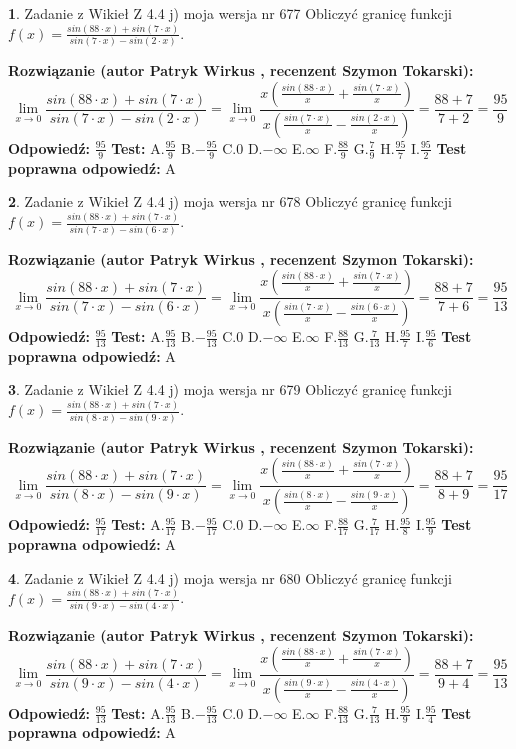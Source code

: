 \documentclass[12pt, a4paper]{article}
\theoremstyle{definition} %
\newtheorem{zad}{}
\newcommand{\zadStart}[1]{\begin{zad}#1\newline}
\newcommand{\zadStop}{\end{zad}}
\newcommand{\rozwStart}[2]{\noindent \textbf{Rozwiązanie (autor #1 , recenzent #2): }\newline}
\newcommand{\rozwStop}{\newline}
\newcommand{\odpStart}{\noindent \textbf{Odpowiedź:}\newline}
\newcommand{\odpStop}{\newline}
\newcommand{\testStart}{\noindent \textbf{Test:}\newline}
\newcommand{\testStop}{\newline}
\newcommand{\kluczStart}{\noindent \textbf{Test poprawna odpowiedź:}\newline}
\newcommand{\kluczStop}{\newline}
\begin{document}
\zadStart{Zadanie z Wikieł Z 4.4 j) moja wersja nr 677}
Obliczyć granicę funkcji $f(x)=\frac{sin(88\cdot x) +sin(7\cdot x)}{sin(7\cdot x) -sin(2\cdot x)}$.
\zadStop
\rozwStart{Patryk Wirkus}{Szymon Tokarski}
$$\lim\limits_{x\to 0}\frac{sin(88\cdot x) +sin(7\cdot x)}{sin(7\cdot x) -sin(2\cdot x)}=\lim\limits_{x\to 0}\frac{x(\frac{sin(88\cdot x)}{x}+\frac{sin(7\cdot x)}{x})}{x(\frac{sin(7\cdot x)}{x}-\frac{sin(2\cdot x)}{x})}=\frac{88+7}{7+2} = \frac{95}{9}$$
\rozwStop
\odpStart
$\frac{95}{9}$
\odpStop
\testStart
A.$\frac{95}{9}$
B.$-\frac{95}{9}$
C.$0$
D.$-\infty$
E.$\infty$
F.$\frac{88}{9}$
G.$\frac{7}{9}$
H.$\frac{95}{7}$
I.$\frac{95}{2}$
\testStop
\kluczStart
A
\kluczStop



\zadStart{Zadanie z Wikieł Z 4.4 j) moja wersja nr 678}
Obliczyć granicę funkcji $f(x)=\frac{sin(88\cdot x) +sin(7\cdot x)}{sin(7\cdot x) -sin(6\cdot x)}$.
\zadStop
\rozwStart{Patryk Wirkus}{Szymon Tokarski}
$$\lim\limits_{x\to 0}\frac{sin(88\cdot x) +sin(7\cdot x)}{sin(7\cdot x) -sin(6\cdot x)}=\lim\limits_{x\to 0}\frac{x(\frac{sin(88\cdot x)}{x}+\frac{sin(7\cdot x)}{x})}{x(\frac{sin(7\cdot x)}{x}-\frac{sin(6\cdot x)}{x})}=\frac{88+7}{7+6} = \frac{95}{13}$$
\rozwStop
\odpStart
$\frac{95}{13}$
\odpStop
\testStart
A.$\frac{95}{13}$
B.$-\frac{95}{13}$
C.$0$
D.$-\infty$
E.$\infty$
F.$\frac{88}{13}$
G.$\frac{7}{13}$
H.$\frac{95}{7}$
I.$\frac{95}{6}$
\testStop
\kluczStart
A
\kluczStop



\zadStart{Zadanie z Wikieł Z 4.4 j) moja wersja nr 679}
Obliczyć granicę funkcji $f(x)=\frac{sin(88\cdot x) +sin(7\cdot x)}{sin(8\cdot x) -sin(9\cdot x)}$.
\zadStop
\rozwStart{Patryk Wirkus}{Szymon Tokarski}
$$\lim\limits_{x\to 0}\frac{sin(88\cdot x) +sin(7\cdot x)}{sin(8\cdot x) -sin(9\cdot x)}=\lim\limits_{x\to 0}\frac{x(\frac{sin(88\cdot x)}{x}+\frac{sin(7\cdot x)}{x})}{x(\frac{sin(8\cdot x)}{x}-\frac{sin(9\cdot x)}{x})}=\frac{88+7}{8+9} = \frac{95}{17}$$
\rozwStop
\odpStart
$\frac{95}{17}$
\odpStop
\testStart
A.$\frac{95}{17}$
B.$-\frac{95}{17}$
C.$0$
D.$-\infty$
E.$\infty$
F.$\frac{88}{17}$
G.$\frac{7}{17}$
H.$\frac{95}{8}$
I.$\frac{95}{9}$
\testStop
\kluczStart
A
\kluczStop



\zadStart{Zadanie z Wikieł Z 4.4 j) moja wersja nr 680}
Obliczyć granicę funkcji $f(x)=\frac{sin(88\cdot x) +sin(7\cdot x)}{sin(9\cdot x) -sin(4\cdot x)}$.
\zadStop
\rozwStart{Patryk Wirkus}{Szymon Tokarski}
$$\lim\limits_{x\to 0}\frac{sin(88\cdot x) +sin(7\cdot x)}{sin(9\cdot x) -sin(4\cdot x)}=\lim\limits_{x\to 0}\frac{x(\frac{sin(88\cdot x)}{x}+\frac{sin(7\cdot x)}{x})}{x(\frac{sin(9\cdot x)}{x}-\frac{sin(4\cdot x)}{x})}=\frac{88+7}{9+4} = \frac{95}{13}$$
\rozwStop
\odpStart
$\frac{95}{13}$
\odpStop
\testStart
A.$\frac{95}{13}$
B.$-\frac{95}{13}$
C.$0$
D.$-\infty$
E.$\infty$
F.$\frac{88}{13}$
G.$\frac{7}{13}$
H.$\frac{95}{9}$
I.$\frac{95}{4}$
\testStop
\kluczStart
A
\kluczStop
\end{document}
